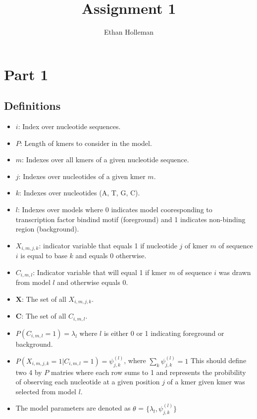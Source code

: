 \documentclass[12pt]{article}
\theoremstyle{definition}
\begin{document}
\title{
	Assignment 1}

\author{Ethan Holleman}
\maketitle

\section{Part 1}

\subsection{Definitions}

\begin{itemize}
	\item $i$: Index over nucleotide sequences.
	\item $P$: Length of kmers to consider in the model.
	\item $m$: Indexes over all kmers of a given nucleotide sequence.
	\item $j$: Indexes over nucleotides of a given kmer $m$.
	\item $k$: Indexes over nucleotides (A, T, G, C).
	\item $l$: Indexes over models where 0 indicates model cooresponding to transcription factor bindind motif (foreground) and 1 indicates non-binding region (background).
	\item $X_{i,m,j,k}$: indicator variable that equals 1 if nucleotide $j$ of kmer $m$ of sequence $i$ is equal to base $k$ and equals 0 otherwise.
	\item $C_{i, m, l}$: Indicator variable that will equal 1 if kmer $m$ of sequence $i$ was drawn from model $l$ and otherwise equals 0. 
	\item $\boldsymbol{X}$: The set of all $X_{i,m,j,k}$.
	\item $\boldsymbol{C}$: The set of all $C_{i, m, l}$.
	\item $P(C_{i,m,l}=1) = \lambda_{l}$ where $l$ is either 0 or 1 indicating foreground or background. 
	\item $P(X_{i,m,j,k} = 1 | C_{i,m,l}=1) = \psi^{(l)}_{j,k}$, where
	$\sum_{k}\psi^{(l)}_{j,k}=1$
	\subitem This should define two 4 by $P$ matries where each row sums to 1 and represents the probibility of observing each nucleotide at a given position $j$ of a kmer given kmer was selected from model $l$.
	\item The model parameters are denoted as $\theta$ = $\{\lambda_{l}, \psi^{(l)}_{j,k}\}$
\end{itemize}
\end{document}
